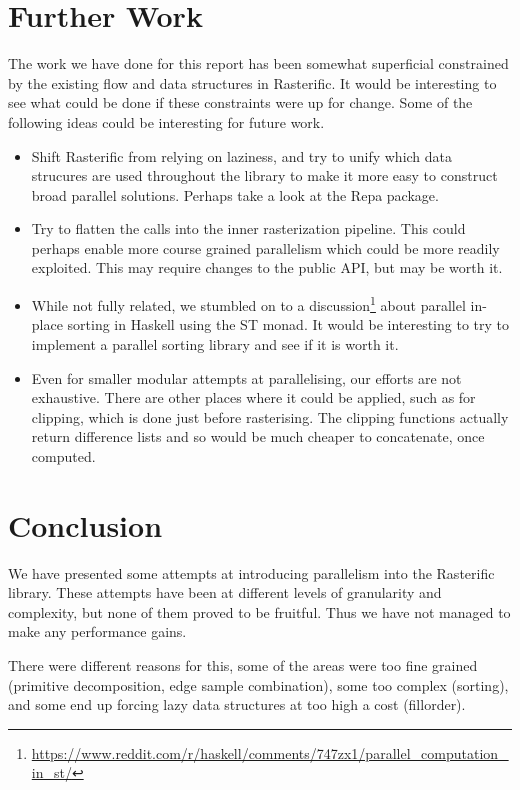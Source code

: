 \documentclass[12pt, a4paper]{article}
\begin{document}
\section{Further Work}\label{furtherwork}
The work we have done for this report has been somewhat superficial constrained by the existing flow and data structures in Rasterific.
 It would be interesting to see what could be done if these constraints were up for change. Some of the following ideas could be interesting for future work.
\begin{itemize}
\item Shift Rasterific from relying on laziness, and try to unify which data strucures are used throughout the library to make it more easy to construct
  broad parallel solutions. Perhaps take a look at the Repa package.
\item Try to flatten the calls into the inner rasterization pipeline. This could perhaps enable more course grained parallelism which could be more readily exploited.
  This may require changes to the public API, but may be worth it.
\item While not fully related, we stumbled on to a discussion\footnote{\url{https://www.reddit.com/r/haskell/comments/747zx1/parallel_computation_in_st/}}
  about parallel in-place sorting in Haskell using the ST monad.
  It would be interesting to try to implement a parallel sorting library and see if it is worth it.
  
\item Even for smaller modular attempts at parallelising, our efforts are not exhaustive. There are other places where it could be applied, such as for clipping, which is done just before rasterising. The clipping functions actually return difference lists and so would be much cheaper to concatenate, once computed.
\end{itemize}

\section{Conclusion}
We have presented some attempts at introducing parallelism into the Rasterific library. These attempts
have been at different levels of granularity and complexity, but none of them proved to be fruitful.
Thus we have not managed to make any performance gains.

There were different reasons for this, some of the areas were too fine grained (primitive decomposition, edge sample combination), some too complex (sorting), and
some end up forcing lazy data structures at too high a cost (fillorder).
\end{document}
